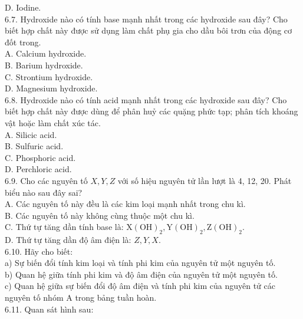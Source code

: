 \documentclass[10pt]{article}
\begin{document}
D. Iodine.\\
6.7. Hydroxide nào có tính base mạnh nhất trong các hydroxide sau đây? Cho biết hợp chất này được sử dụng làm chất phụ gia cho dầu bôi trơn của động cơ đốt trong.\\
A. Calcium hydroxide.\\
B. Barium hydroxide.\\
C. Strontium hydroxide.\\
D. Magnesium hydroxide.\\
6.8. Hydroxide nào có tính acid mạnh nhất trong các hydroxide sau đây? Cho biết hợp chất này được dùng để phân huỷ các quặng phức tạp; phân tích khoáng vật hoặc làm chất xúc tác.\\
A. Silicic acid.\\
B. Sulfuric acid.\\
C. Phosphoric acid.\\
D. Perchloric acid.\\
6.9. Cho các nguyên tố $X, Y, Z$ với số hiệu nguyên tử lần lượt là 4, 12, 20. Phát biểu nào sau đây sai?\\
A. Các nguyên tố này đều là các kim loại mạnh nhất trong chu kì.\\
B. Các nguyên tố này không cùng thuộc một chu kì.\\
C. Thứ tự tăng dần tính base là: $\mathrm{X}(\mathrm{OH})_{2}, \mathrm{Y}(\mathrm{OH})_{2}, \mathrm{Z}(\mathrm{OH})_{2}$.\\
D. Thứ tự tăng dần độ âm điện là: $Z, Y, X$.\\
6.10. Hãy cho biết:\\
a) Sự biến đổi tính kim loại và tính phi kim của nguyên tử một nguyên tố.\\
b) Quan hệ giữa tính phi kim và độ âm điện của nguyên tử một nguyên tố.\\
c) Quan hệ giữa sự biến đổi độ âm điện và tính phi kim của nguyên tử các nguyên tố nhóm A trong bảng tuần hoàn.\\
6.11. Quan sát hình sau:
\end{document}
